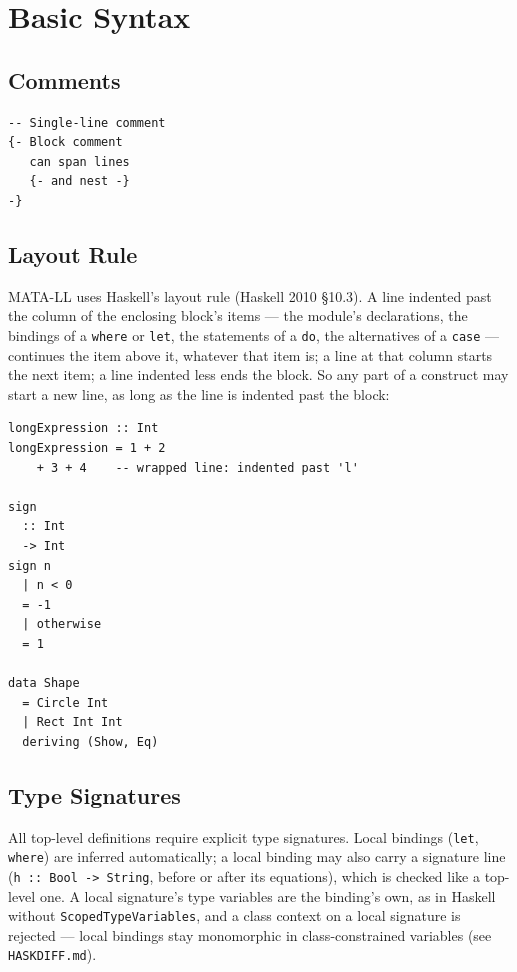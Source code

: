 \documentclass[11pt,a4paper]{article}
\begin{document}
\section{Basic Syntax}

\subsection{Comments}

\begin{lstlisting}
-- Single-line comment
{- Block comment
   can span lines
   {- and nest -}
-}
\end{lstlisting}

\subsection{Layout Rule}

MATA-LL uses Haskell's layout rule (Haskell 2010 \S10.3).  A line indented
past the column of the enclosing block's items --- the module's
declarations, the bindings of a \texttt{where} or \texttt{let}, the
statements of a \texttt{do}, the alternatives of a \texttt{case} ---
continues the item above it, whatever that item is; a line at that column
starts the next item; a line indented less ends the block.  So any part of
a construct may start a new line, as long as the line is indented past the
block:

\begin{lstlisting}
longExpression :: Int
longExpression = 1 + 2
    + 3 + 4    -- wrapped line: indented past 'l'

sign
  :: Int
  -> Int
sign n
  | n < 0
  = -1
  | otherwise
  = 1

data Shape
  = Circle Int
  | Rect Int Int
  deriving (Show, Eq)
\end{lstlisting}

\subsection{Type Signatures}

All top-level definitions require explicit type signatures.  Local bindings
(\texttt{let}, \texttt{where}) are inferred automatically; a local binding
may also carry a signature line (\texttt{h :: Bool -> String}, before or
after its equations), which is checked like a top-level one.  A local
signature's type variables are the binding's own, as in Haskell without
\texttt{ScopedTypeVariables}, and a class context on a local signature
is rejected --- local bindings stay monomorphic in class-constrained
variables (see \texttt{HASKDIFF.md}).
\end{document}
